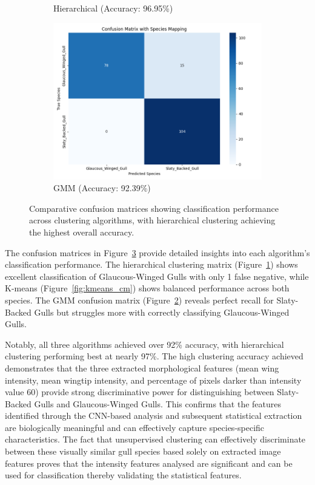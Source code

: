 \documentclass[a4paper,12pt]{report}
\begin{document}
\begin{figure}[H]
\begin{subfigure}[b]{0.32\textwidth}
        \caption{Hierarchical (Accuracy: 96.95\%)}
        \label{fig:hierarchical_cm}
    \end{subfigure}
    \hfill
    \begin{subfigure}[b]{0.32\textwidth}
        \centering
        \includegraphics[width=\textwidth]{images/clustering/gmm_confusion_matrix.png}
        \caption{GMM (Accuracy: 92.39\%)}
        \label{fig:gmm_cm}
    \end{subfigure}
    \caption{Comparative confusion matrices showing classification performance across clustering algorithms, with hierarchical clustering achieving the highest overall accuracy.}
    \label{fig:confusion_matrices}
\end{figure}

The confusion matrices in Figure~\ref{fig:confusion_matrices} provide detailed insights into each algorithm's classification performance. The hierarchical clustering matrix (Figure~\ref{fig:hierarchical_cm}) shows excellent classification of Glaucous-Winged Gulls with only 1 false negative, while K-means (Figure~\ref{fig:kmeans_cm}) shows balanced performance across both species. The GMM confusion matrix (Figure~\ref{fig:gmm_cm}) reveals perfect recall for Slaty-Backed Gulls but struggles more with correctly classifying Glaucous-Winged Gulls.

Notably, all three algorithms achieved over 92\% accuracy, with hierarchical clustering performing best at nearly 97\%. The high clustering accuracy achieved demonstrates that the three extracted morphological features (mean wing intensity, mean wingtip intensity, and percentage of pixels darker than intensity value 60) provide strong discriminative power for distinguishing between Slaty-Backed Gulls and Glaucous-Winged Gulls. This confirms that the features identified through the CNN-based analysis and subsequent statistical extraction are biologically meaningful and can effectively capture species-specific characteristics. The fact that unsupervised clustering can effectively discriminate between these visually similar gull species based solely on extracted image features proves that the intensity features analysed are significant and can be used for classification thereby validating the statistical features.
\end{document}
